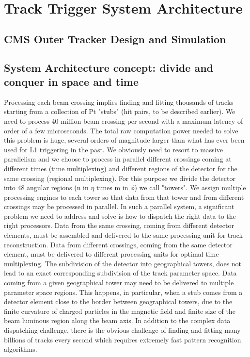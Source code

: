 \section{Track Trigger System Architecture\label{sec:tracktrigger}}


\subsection{CMS Outer Tracker Design and Simulation }


\subsection{System Architecture concept: divide and conquer in space and time }

	Processing each beam crossing implies finding and fitting thousands of tracks starting from a collection of Pt "stubs" (hit pairs, to be described earlier). We need to process 40 million beam crossing per second with a maximum latency of order of a few microseconds. The total raw computation power needed to solve this problem is huge, several orders of magnitude larger than what has ever been used for L1 triggering in the past. We obviously need to resort to massive parallelism and we choose to process in parallel different crossings coming at different times (time multiplexing) and different regions of the detector for the same crossing (regional multiplexing). For this purpose we divide the detector into 48 angular regions (n in $\eta$ times m in $\phi$) we call "towers". We assign multiple processing engines to each tower so that data from that  tower and from different crossings may be processed in parallel. In such a parallel system, a significant  problem we need to address and solve is how to dispatch the right data to the right processors. Data from the same crossing, coming from different detector elements, must be assembled and delivered to the same processing unit for track reconstruction. Data from different crossings, coming from the same detector element, must be delivered to different processing units for optimal time multiplexing. The subdivision of the detector into geographical towers, does not lead to an exact corresponding subdivision of the track parameter space. Data coming from a given geographical tower may need to be delivered to multiple parameter space regions. This happens, in particular, when a stub comes from a detector element close to the border between geographical towers, due to the finite curvature of charged particles in the magnetic field and finite size of the beam luminous region along the beam axis. In addition to the complex data dispatching challenge, there is the obvious challenge of finding and fitting many billions of tracks every second which requires extremely fast pattern recognition algorithms. 

